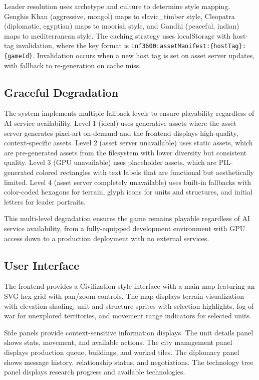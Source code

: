 \documentclass[conference]{IEEEtran}
\begin{document}
Leader resolution uses archetype and culture to determine style mapping. Genghis Khan (aggressive, mongol) maps to slavic\_timber style, Cleopatra (diplomatic, egyptian) maps to moorish style, and Gandhi (peaceful, indian) maps to mediterranean style. The caching strategy uses localStorage with host-tag invalidation, where the key format is \texttt{inf3600:assetManifest:\{hostTag\}:\{gameId\}}. Invalidation occurs when a new host tag is set on asset server updates, with fallback to re-generation on cache miss.

\subsection{Graceful Degradation}

The system implements multiple fallback levels to ensure playability regardless of AI service availability. Level 1 (ideal) uses generative assets where the asset server generates pixel-art on-demand and the frontend displays high-quality, context-specific assets. Level 2 (asset server unavailable) uses static assets, which are pre-generated assets from the filesystem with lower diversity but consistent quality. Level 3 (GPU unavailable) uses placeholder assets, which are PIL-generated colored rectangles with text labels that are functional but aesthetically limited. Level 4 (asset server completely unavailable) uses built-in fallbacks with color-coded hexagons for terrain, glyph icons for units and structures, and initial letters for leader portraits.

This multi-level degradation ensures the game remains playable regardless of AI service availability, from a fully-equipped development environment with GPU access down to a production deployment with no external services.

\subsection{User Interface}

The frontend provides a Civilization-style interface with a main map featuring an SVG hex grid with pan/zoom controls. The map displays terrain visualization with elevation shading, unit and structure sprites with selection highlights, fog of war for unexplored territories, and movement range indicators for selected units.

Side panels provide context-sensitive information displays. The unit details panel shows stats, movement, and available actions. The city management panel displays production queue, buildings, and worked tiles. The diplomacy panel shows message history, relationship status, and negotiations. The technology tree panel displays research progress and available technologies.
\end{document}

